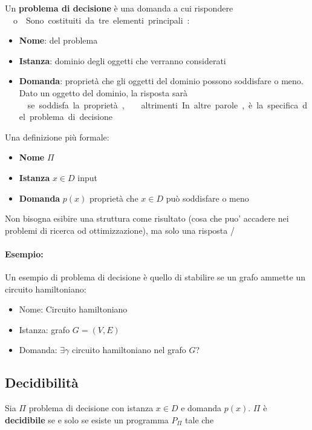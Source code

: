 Un \textbf{problema di decisione} è una domanda a cui rispondere \si\ o \no. Sono costituiti da tre elementi principali:
\begin{itemize}
	\item \textbf{Nome}: del problema
	\item \textbf{Istanza}: dominio degli oggetti che verranno considerati
	\item \textbf{Domanda}: proprietà che gli oggetti del dominio possono soddisfare o meno. Dato un oggetto del dominio, la risposta sarà \si\ se soddisfa la proprietà, \no\ altrimenti. In altre parole, è la specifica del problema di decisione
\end{itemize}

Una definizione più formale:
\begin{itemize}
	\item \textbf{Nome} $\Pi$
	\item \textbf{Istanza} $x \in D$ input
	\item \textbf{Domanda} $p(x)$ proprietà che $x \in D$ può soddisfare o meno
\end{itemize}

Non bisogna esibire una struttura come risultato (cosa che puo' accadere nei problemi di ricerca od ottimizzazione), ma solo una risposta \si/\no.

\vspace{-1em}

\paragraph{Esempio:} Un esempio di problema di decisione è quello di stabilire se un grafo ammette un circuito hamiltoniano:
\begin{itemize}
	\item Nome: Circuito hamiltoniano
	\item Istanza: grafo $G = (V,E)$
	\item Domanda: $\exists \gamma$ circuito hamiltoniano nel grafo $G$?
\end{itemize} 

\vspace{-0.5em}

\subsection{Decidibilità}

Sia $\Pi$ problema di decisione con istanza $x \in D$ e domanda $p(x)$. $\Pi$ è \textbf{decidibile} se e solo se esiste un programma $P_\Pi$ tale che
\begin{center}
	
\end{center}

